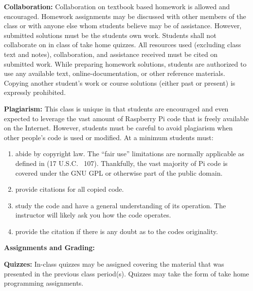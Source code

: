 \documentclass[12pt]{article}
\begin{document}
\vspace*{.15in}
\noindent\textbf{Collaboration:} Collaboration on textbook based homework is allowed and encouraged. Homework assignments may be discussed with other members of the class or with anyone else whom students believe may be of assistance. However, submitted solutions must be the students own work. Students shall not collaborate on in class of take home quizzes. All resources used (excluding class text and notes), collaboration, and assistance received must be cited on submitted work. While preparing homework solutions, students are authorized to use any available text, online-documentation, or other reference materials. Copying another student’s work or course solutions (either past or present) is expressly prohibited.




\vspace*{.15in}
\noindent\textbf{Plagiarism:} This class is unique in that students are encouraged and even expected to leverage the vast amount of Raspberry Pi code that is freely available on the Internet.  However, students must be careful to avoid plagiarism when other people's code is used or modified.  At a minimum students must:
\begin{enumerate}
    \item abide by copyright law.  The “fair use” limitations are normally applicable as defined in (17 U.S.C. \textsection\ 107).  Thankfully, the vast majority of Pi code is covered under the GNU GPL or otherwise part of the public domain.

    \item provide citations for all copied code.

    \item study the code and have a general understanding of its operation.  The instructor will likely ask you how the code operates.

    \item provide the citation if there is any doubt as to the codes originality.
\end{enumerate}



\vspace*{.15in}

\newpage

\vspace*{.15in}
\noindent\textbf{Assignments and Grading:}




\vspace*{.15in}
\textbf{Quizzes:}  In-class quizzes may be assigned covering the material that was presented in the previous class period(s).  Quizzes may take the form of take home programming assignments.
\end{document}
